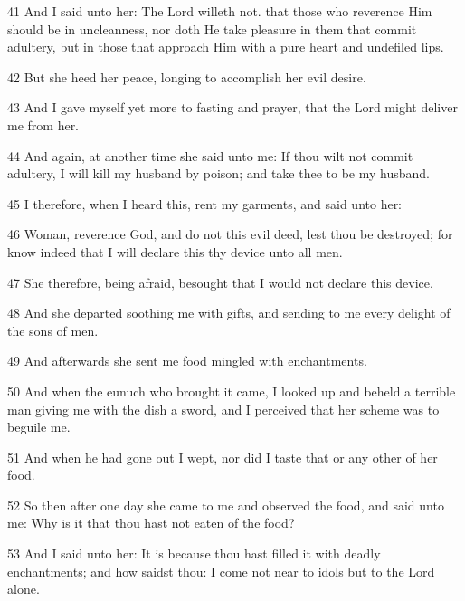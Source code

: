 \par 41 And I said unto her: The Lord willeth not. that those who reverence Him should be in uncleanness, nor doth He take pleasure in them that commit adultery, but in those that approach Him with a pure heart and undefiled lips.

\par 42 But she heed her peace, longing to accomplish her evil desire.

\par 43 And I gave myself yet more to fasting and prayer, that the Lord might deliver me from her.

\par 44 And again, at another time she said unto me: If thou wilt not commit adultery, I will kill my husband by poison; and take thee to be my husband.

\par 45 I therefore, when I heard this, rent my garments, and said unto her:

\par 46 Woman, reverence God, and do not this evil deed, lest thou be destroyed; for know indeed that I will declare this thy device unto all men.

\par 47 She therefore, being afraid, besought that I would not declare this device.

\par 48 And she departed soothing me with gifts, and sending to me every delight of the sons of men.

\par 49 And afterwards she sent me food mingled with enchantments.

\par 50 And when the eunuch who brought it came, I looked up and beheld a terrible man giving me with the dish a sword, and I perceived that her scheme was to beguile me.

\par 51 And when he had gone out I wept, nor did I taste that or any other of her food.

\par 52 So then after one day she came to me and observed the food, and said unto me: Why is it that thou hast not eaten of the food?

\par 53 And I said unto her: It is because thou hast filled it with deadly enchantments; and how saidst thou: I come not near to idols but to the Lord alone.


